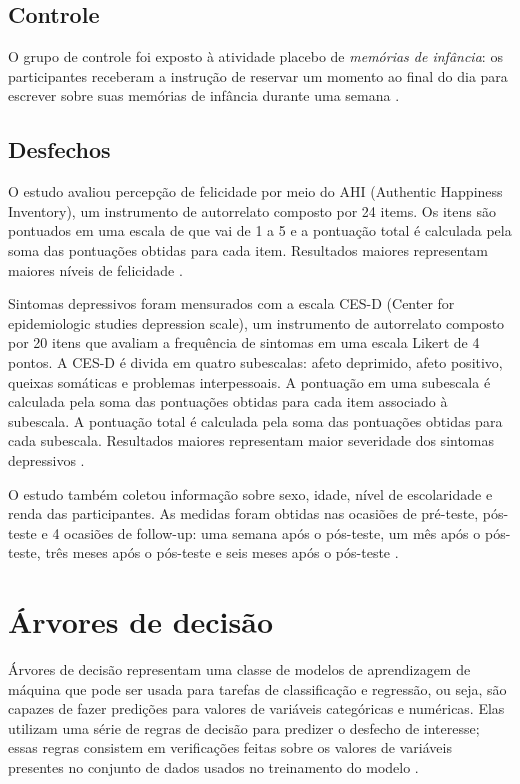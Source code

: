 \subsection{Controle}

O grupo de controle foi exposto à atividade placebo de \emph{memórias de infância}: os participantes receberam a instrução de reservar um momento ao
final do dia para escrever sobre suas memórias de infância durante uma semana \cite{Woodworth2017}.

\subsection{Desfechos}

O estudo avaliou percepção de felicidade por meio do AHI (Authentic Happiness Inventory), um instrumento de autorrelato composto por 24 items. Os itens
são pontuados em uma escala de que vai de 1 a 5 e a pontuação total é calculada pela soma das pontuações obtidas para cada item. Resultados maiores representam
maiores níveis de felicidade \cite{Park2010}.

Sintomas depressivos foram mensurados com a escala CES-D (Center for epidemiologic studies depression scale), um instrumento de autorrelato composto por 20
itens que avaliam a frequência de sintomas em uma escala Likert de 4 pontos. A CES-D é divida em quatro subescalas: afeto deprimido, afeto positivo, queixas
somáticas e problemas interpessoais. A pontuação em uma subescala é calculada pela soma das pontuações obtidas para cada item associado à subescala. A pontuação
total é calculada pela soma das pontuações obtidas para cada subescala. Resultados maiores representam maior severidade dos sintomas depressivos \cite{Radloff1977}.

O estudo também coletou informação sobre sexo, idade, nível de escolaridade e renda das participantes. As medidas foram obtidas nas ocasiões de pré-teste, pós-teste
e 4 ocasiões de follow-up: uma semana após o pós-teste, um mês após o pós-teste, três meses após o pós-teste e seis meses após o pós-teste \cite{Woodworth2017}.

\section{Árvores de decisão}

Árvores de decisão representam uma classe de modelos de aprendizagem de máquina que pode ser usada para tarefas de classificação e regressão, ou seja, são
capazes de fazer predições para valores de variáveis categóricas e numéricas. Elas utilizam uma série de regras de decisão para predizer o desfecho de interesse;
essas regras consistem em verificações feitas sobre os valores de variáveis presentes no conjunto de dados usados no treinamento do modelo \cite{Theobald2021, Bi2019}.


